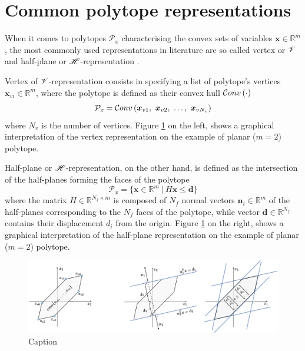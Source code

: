 \section{Common polytope representations}
\label{ch:representations_practical_apps}


When it comes to polytopes $\mathcal{P}_x$ characterising the convex sets of variables $\bm{x}\in\mathbb{R}^m$, the most commonly used representations in literature are so called vertex or $\mathscr{V}$ and half-plane or $\mathscr{H}$-representation \cite{henk2017basic, fukuda2004frequently}. 

Vertex of $\mathscr{V}$-representation consists in specifying a list of polytope's vertices $\bm{x}_{vi}\in\mathbb{R}^m$, where the polytope is defined as their convex hull $\mathcal{C}onv\left(\cdot\right)$
\begin{equation}
\mathcal{P}_x = \mathcal{C}onv\left(\bm{x}_{v1},~\bm{x}_{v2},~ \ldots , ~\bm{x}_{vN_v} \right)
\end{equation} 
where $N_v$ is the number of vertices. Figure \ref{fig:hv_rep} on the left, shows a graphical interpretation of the vertex representation on the example of planar ($m\!=\!2$) polytope. 


Half-plane or $\mathscr{H}$-representation, on the other hand, is defined as the intersection of the half-planes forming the faces of the polytope
\begin{equation}
  \mathcal{P}_x = \{\bm{x} \in \mathbb{R}^m~ |~ H\bm{x} \leq \bm{d} \}
\end{equation} 
where the matrix $H \in \mathbb{R}^{N_f\times m }$ is composed of $N_f$ normal vectors $\bm{n}_i\in\mathbb
{R}^m$ of the half-planes corresponding to the $N_f$ faces of the polytope, while vector $\bm{d}\in \mathbb{R}^{N_f}$ contains their displacement $d_i$ from the origin. Figure \ref{fig:hv_rep} on the right, shows a graphical interpretation of the half-plane representation on the example of planar ($m\!=\!2$) polytope. 

\begin{figure}[!t]
    \centering
    \includegraphics[width=\linewidth]{Chapters/imgs/h_v_rep.pdf}
    \caption{Caption}
    \label{fig:hv_rep}
\end{figure}

